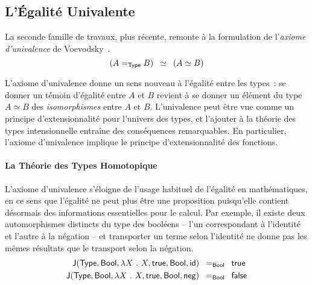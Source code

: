 \subsection{L'Égalité Univalente}

La seconde famille de travaux, plus récente, remonte à la formulation de
l'\emph{axiome d'univalence} de Voevodsky~.
\[
(A =_{\mathsf{Type}} B) \enskip \simeq \enskip  (A \simeq B)
\]

L'axiome d'univalence donne un sens nouveau à l'égalité entre les types~: 
% 
% 
se donner un témoin d'égalité entre \( A \) et \( B \) revient à se donner un 
élément du type \( A \simeq B \) des \emph{isomorphismes} entre \( A \) et \( B \). 
% 
L'univalence peut être vue comme un principe d'extensionnalité pour l'univers 
des types, et l'ajouter à la théorie des types intensionnelle entraîne des 
conséquences remarquables. 
% 
En particulier, l'axiome d'univalence implique le principe d'extensionnalité des 
fonctions.

\paragraph*{La Théorie des Types Homotopique}
% 
L'axiome d'univalence s'éloigne de l'usage habituel de l'égalité en mathématiques,
en ce sens que l'égalité ne peut plus être une proposition puisqu'elle contient 
désormais des informations essentielles pour le calcul.  
% 
Par exemple, il existe deux automorphismes distincts du type des booléens -- l'un 
correspondant à l'identité et l'autre à la négation -- et transporter un terme selon 
l'identité ne donne pas les mêmes résultats que le transport selon la négation.
% 
\[
\begin{split}
\indJ{\varType}{\mathsf{Bool}}{\lambda X\ .\ X}{\mathsf{true}}{\mathsf{Bool}}{\mathsf{id}} & \enskip =_{\mathsf{Bool}} \enskip \mathsf{true} \\
\indJ{\varType}{\mathsf{Bool}}{\lambda X\ .\ X}{\mathsf{true}}{\mathsf{Bool}}{\mathsf{neg}} & \enskip =_{\mathsf{Bool}} \enskip \mathsf{false}
\end{split}
\]

